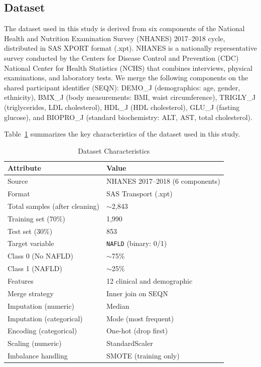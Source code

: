 \documentclass[conference,10pt]{IEEEtran}
\begin{document}
\subsection{Dataset}
\label{subsec:dataset}

The dataset used in this study is derived from six components of the National Health and Nutrition Examination Survey (NHANES) 2017--2018 cycle, distributed in SAS XPORT format (.xpt). NHANES is a nationally representative survey conducted by the Centers for Disease Control and Prevention (CDC) National Center for Health Statistics (NCHS) that combines interviews, physical examinations, and laboratory tests. We merge the following components on the shared participant identifier (SEQN): DEMO\_J (demographics: age, gender, ethnicity), BMX\_J (body measurements: BMI, waist circumference), TRIGLY\_J (triglycerides, LDL cholesterol), HDL\_J (HDL cholesterol), GLU\_J (fasting glucose), and BIOPRO\_J (standard biochemistry: ALT, AST, total cholesterol).

Table~\ref{tab:dataset} summarizes the key characteristics of the dataset used in this study.

\begin{table}[!t]
\centering
\caption{Dataset Characteristics}
\label{tab:dataset}
\begin{tabular}{ll}
\toprule
\textbf{Attribute} & \textbf{Value} \\
\midrule
Source & NHANES 2017--2018 (6 components) \\
Format & SAS Transport (.xpt) \\
Total samples (after cleaning) & $\sim$2,843 \\
Training set (70\%) & 1,990 \\
Test set (30\%) & 853 \\
Target variable & \texttt{NAFLD} (binary: 0/1) \\
Class 0 (No NAFLD) & $\sim$75\% \\
Class 1 (NAFLD) & $\sim$25\% \\
Features & 12 clinical and demographic \\
Merge strategy & Inner join on SEQN \\
Imputation (numeric) & Median \\
Imputation (categorical) & Mode (most frequent) \\
Encoding (categorical) & One-hot (drop first) \\
Scaling (numeric) & StandardScaler \\
Imbalance handling & SMOTE (training only) \\
\bottomrule
\end{tabular}
\end{table}
\end{document}
